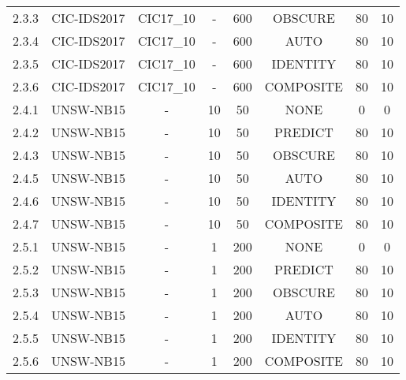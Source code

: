 \begin{table}[h]
{\begin{tabular}{cccccccc}
		2.3.3 \label{ex_2_3_3} & CIC-IDS2017 & CIC17\_10  & -           & 600           & OBSCURE      & 80        & 10          \\
		2.3.4 \label{ex_2_3_4} & CIC-IDS2017 & CIC17\_10  & -           & 600           & AUTO       & 80        & 10          \\
		2.3.5 \label{ex_2_3_5} & CIC-IDS2017 & CIC17\_10  & -           & 600           & IDENTITY   & 80        & 10          \\
		2.3.6 \label{ex_2_3_6} & CIC-IDS2017 & CIC17\_10  & -           & 600           & COMPOSITE  & 80        & 10          \\
		2.4.1 \label{ex_2_4_1} & UNSW-NB15    & -          & 10          & 50            & NONE       & 0         & 0           \\
		2.4.2 \label{ex_2_4_2} & UNSW-NB15    & -          & 10          & 50            & PREDICT    & 80        & 10          \\
		2.4.3 \label{ex_2_4_3} & UNSW-NB15    & -          & 10          & 50            & OBSCURE      & 80        & 10          \\
		2.4.5 \label{ex_2_4_4} & UNSW-NB15    & -          & 10          & 50            & AUTO       & 80        & 10          \\
		2.4.6 \label{ex_2_4_5} & UNSW-NB15    & -          & 10          & 50            & IDENTITY   & 80        & 10          \\
		2.4.7 \label{ex_2_4_6} & UNSW-NB15    & -          & 10          & 50            & COMPOSITE  & 80        & 10          \\
		2.5.1 \label{ex_2_5_1} & UNSW-NB15    & -          & 1           & 200           & NONE       & 0         & 0           \\
		2.5.2 \label{ex_2_5_2} & UNSW-NB15    & -          & 1           & 200           & PREDICT    & 80        & 10          \\
		2.5.3 \label{ex_2_5_3} & UNSW-NB15    & -          & 1           & 200           & OBSCURE      & 80        & 10          \\
		2.5.4 \label{ex_2_5_4} & UNSW-NB15    & -          & 1           & 200           & AUTO       & 80        & 10          \\
		2.5.5 \label{ex_2_5_5} & UNSW-NB15    & -          & 1           & 200           & IDENTITY   & 80        & 10          \\
		2.5.6 \label{ex_2_5_6} & UNSW-NB15    & -          & 1           & 200           & COMPOSITE  & 80        & 10          \\

\end{tabular}}
\end{table}
